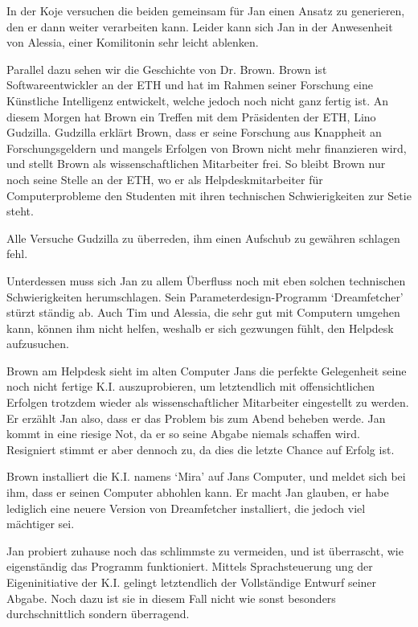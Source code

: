 \documentclass[11pt,a4paper,ngerman]{scrreprt}
\begin{document}
In der Koje versuchen die beiden gemeinsam für Jan einen Ansatz zu
generieren, den er dann weiter verarbeiten kann. Leider kann sich Jan in der
Anwesenheit von Alessia, einer Komilitonin sehr leicht ablenken.

Parallel dazu sehen wir die Geschichte von Dr. Brown. Brown ist
Softwareentwickler an der ETH und hat im Rahmen seiner Forschung eine
Künstliche Intelligenz entwickelt, welche jedoch noch nicht ganz fertig
ist. An diesem Morgen hat Brown ein Treffen mit dem Präsidenten der ETH, Lino
Gudzilla. Gudzilla erklärt Brown, dass er seine Forschung aus Knappheit an
Forschungsgeldern und mangels Erfolgen von Brown nicht mehr finanzieren wird,
und stellt Brown als wissenschaftlichen Mitarbeiter frei. So bleibt Brown nur
noch seine Stelle an der ETH, wo er als Helpdeskmitarbeiter für
Computerprobleme den Studenten mit ihren technischen Schwierigkeiten zur
Setie steht.

Alle Versuche Gudzilla zu überreden, ihm einen Aufschub zu gewähren schlagen
fehl.

Unterdessen muss sich Jan zu allem Überfluss noch mit eben solchen
technischen Schwierigkeiten herumschlagen. Sein Parameterdesign-Programm
`Dreamfetcher' stürzt ständig ab. Auch Tim und Alessia, die sehr gut mit
Computern umgehen kann, können ihm nicht helfen, weshalb er sich gezwungen
fühlt, den Helpdesk aufzusuchen.

Brown am Helpdesk sieht im alten Computer Jans die perfekte Gelegenheit seine
noch nicht fertige K.I. auszuprobieren, um letztendlich mit offensichtlichen
Erfolgen trotzdem wieder als wissenschaftlicher Mitarbeiter eingestellt zu
werden. Er erzählt Jan also, dass er das Problem bis zum Abend beheben
werde. Jan kommt in eine riesige Not, da er so seine Abgabe niemals schaffen
wird. Resigniert stimmt er aber dennoch zu, da dies die letzte Chance auf
Erfolg ist.

Brown installiert die K.I. namens `Mira' auf Jans Computer, und meldet sich
bei ihm, dass er seinen Computer abhohlen kann. Er macht Jan glauben, er habe
lediglich eine neuere Version von Dreamfetcher installiert, die jedoch viel
mächtiger sei.

Jan probiert zuhause noch das schlimmste zu vermeiden, und ist überrascht,
wie eigenständig das Programm funktioniert. Mittels Sprachsteuerung ung der
Eigeninitiative der K.I. gelingt letztendlich der Vollständige Entwurf seiner
Abgabe. Noch dazu ist sie in diesem Fall nicht wie sonst besonders
durchschnittlich sondern überragend.
\end{document}
